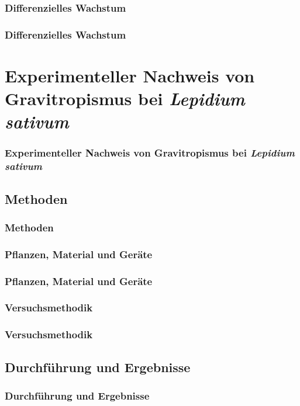 \documentclass[11pt, aspectratio=169]{beamer}
\begin{document}
	\subsubsection{Differenzielles Wachstum}
		
	\begin{frame}
		\frametitle{Differenzielles Wachstum}
	\end{frame}
	
	\section{Experimenteller Nachweis von Gravitropismus bei \protect\emph{Lepidium sativum}}
	
	\begin{frame}
		\frametitle{Experimenteller Nachweis von Gravitropismus bei \protect\emph{Lepidium sativum}}
	\end{frame}	
	
	\subsection{Methoden}
	
	\begin{frame}
		\frametitle{Methoden}
	\end{frame}
	
	\subsubsection{Pflanzen, Material und Geräte}

	\begin{frame}
		\frametitle{Pflanzen, Material und Geräte}
	\end{frame}
	
	\subsubsection{Versuchsmethodik}
	
	\begin{frame}
		\frametitle{Versuchsmethodik}
	\end{frame}
	
	\subsection{Durchführung und Ergebnisse}
	
	\begin{frame}
		\frametitle{Durchführung und Ergebnisse}
	\end{frame}
	
\end{document}
